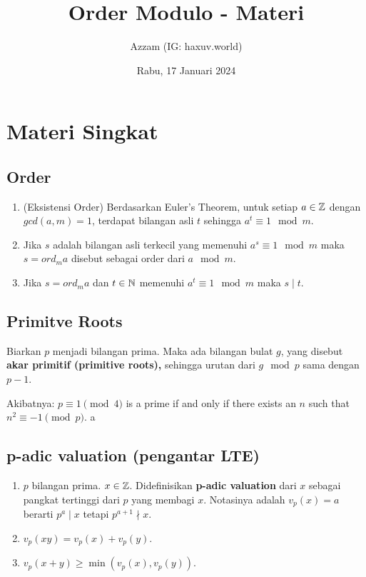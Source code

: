 \documentclass[12pt]{scrartcl}
\title{Order Modulo - Materi}
\author{Azzam (IG: haxuv.world)}
\date{Rabu, 17 Januari 2024}
\begin{document}
\maketitle

\renewcommand*\contentsname{Daftar Isi}
\tableofcontents

\newpage

\section{Materi Singkat}
\subsection{Order}
\begin{enumerate}
    \item (Eksistensi Order) Berdasarkan Euler's Theorem, untuk setiap $a \in \mathbb Z$ dengan $gcd(a,m)=1$, terdapat bilangan asli $t$ sehingga $a^t \equiv 1 \mod m$.
    \item Jika $s$ adalah bilangan asli terkecil yang memenuhi $a^s \equiv 1 \mod m$ maka $s = ord_m a$ disebut sebagai order dari $a \mod m$.
    \item Jika $s = ord_m a$ dan $t \in \mathbb N$ memenuhi $a^t \equiv 1 \mod m$ maka $s \mid t$.
\end{enumerate}

\subsection{Primitve Roots}
Biarkan $p$ menjadi bilangan prima. Maka ada bilangan bulat $g$, yang disebut \textbf{akar primitif (primitive roots),} sehingga urutan dari $g \mod p$ sama dengan $p - 1$.

Akibatnya:
$p \equiv 1 \pmod{4}$ is a prime if and only if there exists an $n$ such that $n^2 \equiv -1 \pmod{p}$.
a
\subsection{p-adic valuation (pengantar LTE)}
\begin{enumerate}
    \item $p$ bilangan prima. $x \in \mathbb Z$. Didefinisikan \textbf{p-adic valuation} dari $x$ sebagai pangkat tertinggi dari $p$ yang membagi $x$. Notasinya adalah $v_p(x)=a$ berarti $p^a \mid x$ tetapi $p^{a+1} \nmid x$.
    \item $v_p(xy) = v_p(x) + v_p(y)$.
    \item $v_p(x+y) \ge \min(v_p(x),v_p(y))$.
\end{enumerate}
\end{document}
